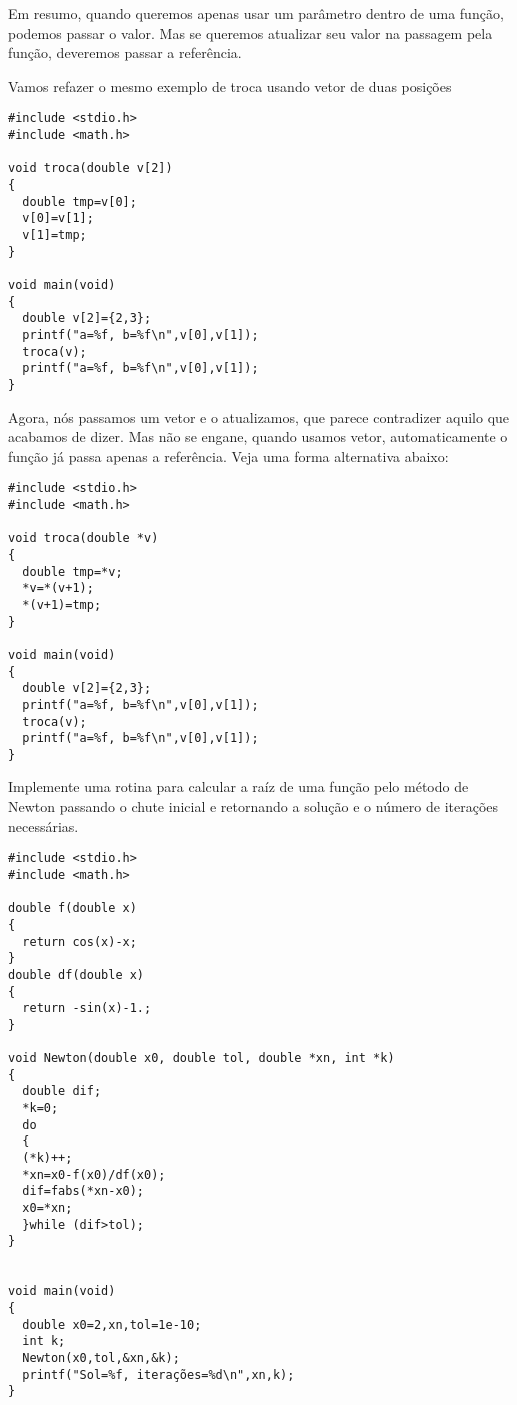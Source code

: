 Em resumo, quando queremos apenas usar um parâmetro dentro de uma função, podemos passar o valor. Mas se queremos atualizar seu valor na passagem pela função, deveremos passar a referência.

Vamos refazer o mesmo exemplo de troca usando vetor de duas posições
\begin{verbatim}
#include <stdio.h>
#include <math.h>

void troca(double v[2])
{
  double tmp=v[0];
  v[0]=v[1];
  v[1]=tmp;
}

void main(void)
{
  double v[2]={2,3};
  printf("a=%f, b=%f\n",v[0],v[1]);
  troca(v);
  printf("a=%f, b=%f\n",v[0],v[1]);
}
\end{verbatim}

Agora, nós passamos um vetor e o atualizamos, que parece contradizer aquilo que acabamos de dizer. Mas não se engane, quando usamos vetor, automaticamente o função já passa apenas a referência. Veja uma forma alternativa abaixo:
\begin{verbatim}
#include <stdio.h>
#include <math.h>

void troca(double *v)
{
  double tmp=*v;
  *v=*(v+1);
  *(v+1)=tmp;
}

void main(void)
{
  double v[2]={2,3};
  printf("a=%f, b=%f\n",v[0],v[1]);
  troca(v);
  printf("a=%f, b=%f\n",v[0],v[1]);
}
\end{verbatim}



\begin{ex}\label{ex_New_pont}
Implemente uma rotina para calcular a raíz de uma função pelo método de Newton passando o chute inicial e retornando a solução e o número de iterações necessárias.
\end{ex}
\begin{verbatim}
#include <stdio.h>
#include <math.h>

double f(double x)
{
  return cos(x)-x;
}
double df(double x)
{
  return -sin(x)-1.;
}

void Newton(double x0, double tol, double *xn, int *k)
{
  double dif;
  *k=0;
  do
  {
  (*k)++;
  *xn=x0-f(x0)/df(x0);
  dif=fabs(*xn-x0);
  x0=*xn;
  }while (dif>tol);
}


void main(void)
{
  double x0=2,xn,tol=1e-10;
  int k;
  Newton(x0,tol,&xn,&k);
  printf("Sol=%f, iterações=%d\n",xn,k);
}
\end{verbatim}

